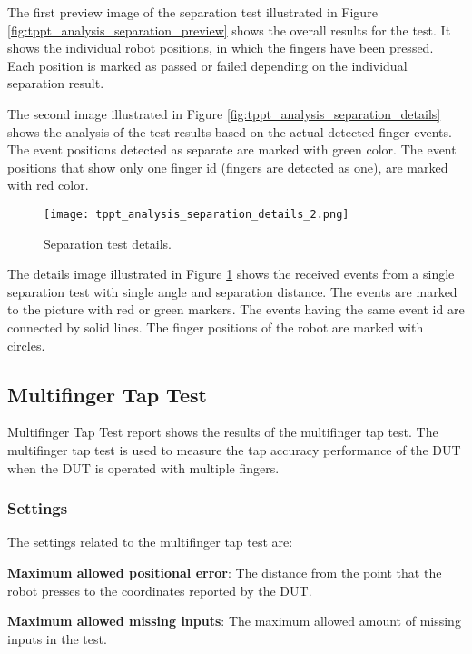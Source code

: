 The first preview image of the separation test illustrated in Figure \ref {fig:tppt_analysis_separation_preview} shows the overall results for the test. It shows the individual robot positions, in which the fingers have been pressed. Each position is marked as passed or failed depending on the individual separation result.

The second image illustrated in Figure \ref{fig:tppt_analysis_separation_details} shows the analysis of the test results based on the actual detected finger events. The event positions detected as separate are marked with green color. The event positions that show only one finger id (fingers are detected as one), are marked with red color.

\begin{figure}[!h]
	\centering
	\texttt{[image: tppt\_analysis\_separation\_details\_2.png]}
	\caption{Separation test details.}
	\label{fig:tppt_analysis_separation_details_2}
\end{figure}

The details image illustrated in Figure \ref{fig:tppt_analysis_separation_details_2} shows the received events from a single separation test with single angle and separation distance. The events are marked to the picture with red or green markers. The events having the same event id are connected by solid lines. The finger positions of the robot are marked with circles.

\subsection{Multifinger Tap Test}

Multifinger Tap Test report shows the results of the multifinger tap test. The multifinger tap test is used to measure the tap accuracy performance of the DUT when the DUT is operated with multiple fingers.

\subsubsection{Settings}

The settings related to the multifinger tap test are:

\textbf{Maximum allowed positional error}: The distance from the point that the robot presses to the coordinates reported by the DUT.

\textbf{Maximum allowed missing inputs}: The maximum allowed amount of missing inputs in the test.

